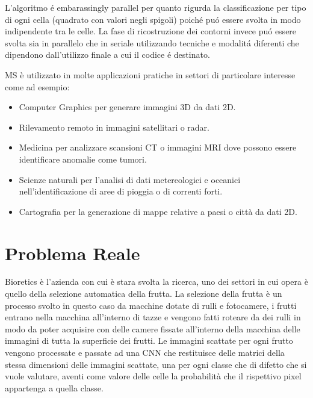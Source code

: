 \documentclass[12pt,a4paper]{report}
\begin{document}
L'algoritmo é embarassingly parallel per quanto rigurda la classificazione per tipo di ogni cella (quadrato con valori negli spigoli) poiché puó essere svolta in modo indipendente tra le celle. \newline
La fase di ricostruzione dei contorni invece puó essere svolta sia in parallelo che in seriale utilizzando tecniche e modalitá diferenti che dipendono dall'utilizzo finale a cui il codice é destinato. \newline

MS è utilizzato in molte applicazioni pratiche in settori di particolare interesse come ad esempio:
\begin{itemize}
\item Computer Graphics per generare immagini 3D da dati 2D.
\item Rilevamento remoto in immagini satellitari o radar.
\item Medicina per analizzare scansioni CT o immagini MRI dove possono essere identificare anomalie come tumori.
\item Scienze naturali per l'analisi di dati metereologici e oceanici nell'identificazione di aree di pioggia o di correnti forti.
\item Cartografia per la generazione di mappe relative a paesi o città da dati 2D.
\end{itemize}

\section{Problema Reale}
Bioretics è l'azienda con cui è stara svolta la ricerca, uno dei settori in cui opera è quello della selezione automatica della frutta. La selezione della frutta è un processo svolto in questo caso da macchine dotate di rulli e fotocamere, i frutti entrano nella macchina all'interno di tazze e vengono fatti roteare da dei rulli in modo da poter acquisire con delle camere fissate all'interno della macchina delle immagini di tutta la superficie dei frutti. Le immagini scattate per ogni frutto vengono processate e passate ad una CNN che restituisce delle matrici della stessa dimensioni delle immagini scattate, una per ogni classe che di difetto che si vuole valutare, aventi come valore delle celle la probabilità che il rispettivo pixel appartenga a quella classe. \newline
\end{document}
